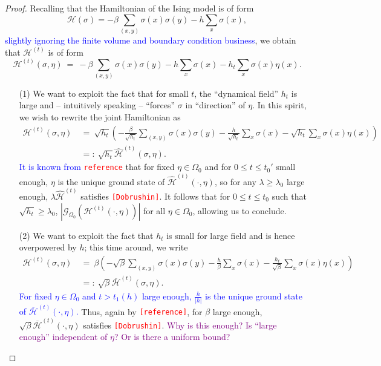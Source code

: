 \documentclass[12pt]{article}
\newcommand{\G}{\mathcal{G}}
\renewcommand{\H}{\mathcal{H}}
\newcommand{\oklepaj}[1]{\left(#1\right)}
\newcommand{\pika}{\boldsymbol{\cdot}}
\newcommand{\1}{\mathbbm{1}}
\newcommand{\5}{\vspace{0.5cm}}
\renewcommand{\hat}{\widehat}
\theoremstyle{definition}
\begin{document}
\begin{proof}
Recalling that the Hamiltonian of the Ising model is of form 
$$\H(\sigma)=-\beta\sum_{(x,y)}\sigma(x)\sigma(y)-h\sum_{x}\sigma(x),$$ 
\textcolor{blue}{slightly ignoring the finite volume and boundary condition business}, we obtain that $\H^{(t)}$ is of form
$$\H^{(t)}(\sigma,\eta) ~=~ -\beta\sum_{(x,y)}\sigma(x)\sigma(y)-h\sum_{x}\sigma(x) - h_t\sum_x \sigma(x)\eta(x).$$
\begin{itemize}
	\item[(1)] We want to exploit the fact that for small $t$, the ``dynamical field'' $h_t$ is large and -- intuitively speaking -- ``forces'' $\sigma$ in ``direction'' of $\eta$. In this spirit, we wish to rewrite the joint Hamiltonian as
\begin{align*}
\H^{(t)}(\sigma,\eta) ~&=~ \sqrt{h_t}\oklepaj{-\frac{\beta}{\sqrt{h_t}}\sum_{(x,y)}\sigma(x)\sigma(y)-\frac{h}{\sqrt{h_t}}\sum_{x}\sigma(x)-\sqrt{h_t}\sum_{x}\sigma(x)\eta(x)} \\
&=:~ \sqrt{h_t}\hat{\H}^{(t)}(\sigma,\eta).
\end{align*}
\textcolor{blue}{It is known from \textcolor{red}{\texttt{reference}}} that for fixed $\eta\in\Omega_0$ and for $0\leq t\leq t_0'$ small enough, $\eta$ is the unique ground state of $\hat{\H}^{(t)}(\pika,\eta)$, so for any $\lambda\geq\lambda_0$ large enough, $\lambda\hat{\H}^{(t)}$ satisfies \textcolor{red}{\texttt{[Dobrushin]}}. It follows that for $0\leq t\leq t_0$ such that $\sqrt{h_t}\geq \lambda_0$, $|\G_{\Omega_0}(\H^{(t)}(\pika,\eta))|$ for all $\eta\in\Omega_0$, allowing us to conclude.
	\item[(2)] We want to exploit the fact that $h_t$ is small for large field and is hence overpowered by $h$; this time around, we write
\begin{align*}
\H^{(t)}(\sigma,\eta) ~&=~ \beta\oklepaj{-\sqrt{\beta}\sum_{(x,y)}\sigma(x)\sigma(y)-\frac{h}{\beta}\sum_{x}\sigma(x)-\frac{h_t}{\sqrt{\beta}}\sum_{x}\sigma(x)\eta(x)} \\
&=:~ \sqrt{\beta}\overline{\H}^{(t)}(\sigma,\eta).
\end{align*}
\textcolor{blue}{For fixed $\eta\in\Omega_0$ and $t>t_1(h)$ large enough, $\frac{h}{|h|}$ is the unique ground state of $\overline{\H}^{(t)}(\pika,\eta)$.} Thus, again by \textcolor{red}{\texttt{[reference]}}, for $\beta$ large enough, $\sqrt{\beta}\overline{\H}^{(t)}(\pika,\eta)$ satisfies \textcolor{red}{\texttt{[Dobrushin]}}. \textcolor{purple}{Why is this enough? Is ``large enough'' independent of $\eta$? Or is there a uniform bound?}
\end{itemize}
\end{proof}
\end{document}
